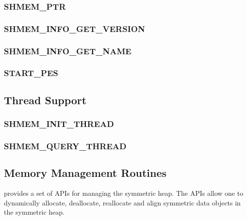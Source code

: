 \documentclass[10pt]{book}
\begin{document}
\subsubsection{\textbf{SHMEM\_PTR}}\label{subsec:shmem_ptr}


\subsubsection{\textbf{SHMEM\_INFO\_GET\_VERSION}}\label{subsec:shmem_info_get_version}


\subsubsection{\textbf{SHMEM\_INFO\_GET\_NAME}}\label{subsec:shmem_info_get_name}


\subsubsection{\textbf{START\_PES}}\label{subsec:start_pes}


\subsection{Thread Support}
\label{subsec:thread_support}


\subsubsection{\textbf{SHMEM\_INIT\_THREAD}}
\label{subsec:shmem_init_thread}


\subsubsection{\textbf{SHMEM\_QUERY\_THREAD}}
\label{subsec:shmem_query_thread}



\subsection{Memory Management Routines}
\label{sec:memory_management}

\openshmem provides a set of \acp{API} for managing the symmetric heap. The
\acp{API} allow one to dynamically allocate, deallocate, reallocate and align
symmetric data objects in the symmetric heap.
\end{document}
